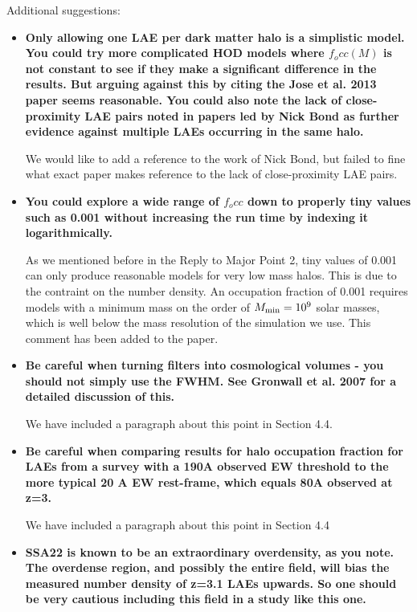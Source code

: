 \documentclass[12pts]{article}
\begin{document}
Additional suggestions:
\begin{itemize}
\item{\bf Only allowing one LAE per dark matter halo is a simplistic model.  You
could try more complicated HOD models where $f_occ(M)$ is not constant
to see if they make a significant difference in the results.  But
arguing against this by citing the Jose et al. 2013 paper seems
reasonable.  You could also note the lack of close-proximity LAE pairs
noted in papers led by Nick Bond as further evidence against multiple
LAEs occurring in the same halo. }

We would like to add a reference to the work of Nick Bond, but failed
to fine what exact paper makes reference to the lack of
close-proximity LAE pairs.

\item{\bf You could explore a wide range of $f_occ$ down to properly tiny values
such as 0.001 without increasing the run time by indexing it
logarithmically.}

As we mentioned before in the Reply to Major Point 2, tiny values of
0.001 can only produce reasonable models for very low mass halos. This
is due to the contraint on the number density. An occupation fraction
of 0.001 requires models with a minimum mass on the order of $M_{\rm
  min}=10^{9}$ solar masses, which is well below the mass resolution
of the simulation we use. This comment has been added to the paper. 


\item {\bf Be careful when turning filters into cosmological volumes - you should
not simply use the FWHM.  See Gronwall et al. 2007 for a detailed
discussion of this.}

We have included a paragraph about this point in Section 4.4.

\item {\bf Be careful when comparing results for halo occupation fraction for
LAEs from a survey with a 190A observed EW threshold to the more
typical 20 A EW rest-frame, which equals 80A observed at z=3. }

We have included a paragraph about this point in Section 4.4

\item {\bf SSA22 is known to be an extraordinary overdensity, as you note.  The
overdense region, and possibly the entire field, will bias the
measured number density of z=3.1 LAEs upwards.  So one should be very
cautious including this field in a study like this one. }


\end{itemize}
\end{document}
